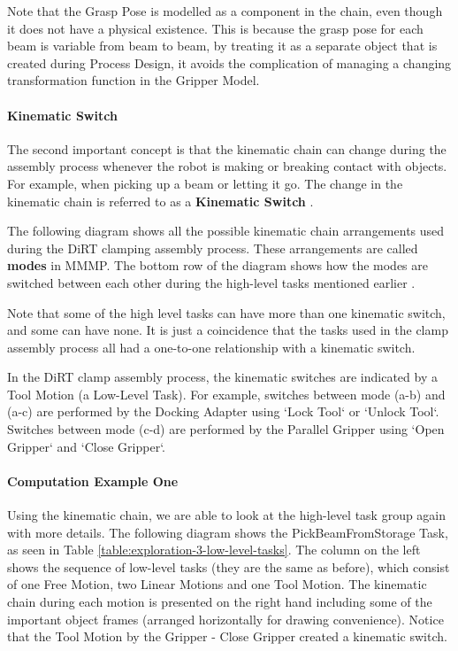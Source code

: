 Note that the Grasp Pose is modelled as a component in the chain, even though it does not have a physical existence. This is because the grasp pose for each beam is variable from beam to beam, by treating it as a separate object that is created during Process Design, it avoids the complication of managing a changing transformation function in the Gripper Model.

\paragraph{Kinematic Switch}

The second important concept is that the kinematic chain can change during the assembly process whenever the robot is making or breaking contact with objects. For example, when picking up a beam or letting it go. The change in the kinematic chain is referred to as a \textbf{Kinematic Switch} \parencite{garrettIntegratedTaskMotion2021a}. 

The following diagram shows all the possible kinematic chain arrangements used during the DiRT clamping assembly process. These arrangements are called \textbf{modes }in MMMP. The bottom row of the diagram shows how the modes are switched between each other during the high-level tasks mentioned earlier . 

Note that some of the high level tasks can have more than one kinematic switch, and some can have none. It is just a coincidence that the tasks used in the clamp assembly process all had a one-to-one relationship with a kinematic switch. 




In the DiRT clamp assembly process, the kinematic switches are indicated by a Tool Motion (a Low-Level Task). For example, switches between mode (a-b) and (a-c) are performed by the Docking Adapter using `Lock Tool` or `Unlock Tool`. Switches between mode (c-d) are performed by the Parallel Gripper using `Open Gripper` and `Close Gripper`.

\paragraph{Computation Example One}

Using the kinematic chain, we are able to look at the high-level task group again with more details. The following diagram shows the PickBeamFromStorage Task, as seen in Table \ref{table:exploration-3-low-level-tasks}. The column on the left shows the sequence of low-level tasks (they are the same as before), which consist of one Free Motion, two Linear Motions and one Tool Motion. The kinematic chain during each motion is presented on the right hand including some of the important object frames (arranged horizontally for drawing convenience). Notice that the Tool Motion by the Gripper - Close Gripper created a kinematic switch. 

